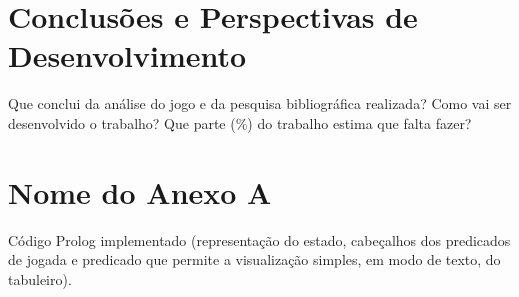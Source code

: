 \documentclass[15pt,a4paper]{article}
\begin{document}
\section{Conclusões e Perspectivas de Desenvolvimento}
Que conclui da análise do jogo e da pesquisa bibliográfica realizada? Como vai ser desenvolvido o trabalho? Que parte (\%) do trabalho estima que falta fazer?

\clearpage
{}
\renewcommand\refname{Bibliografia}



\newpage
\appendix
\section{Nome do Anexo A}
Código Prolog implementado (representação do estado, cabeçalhos dos predicados de jogada e predicado que permite a visualização simples, em modo de texto, do tabuleiro).
\end{document}
